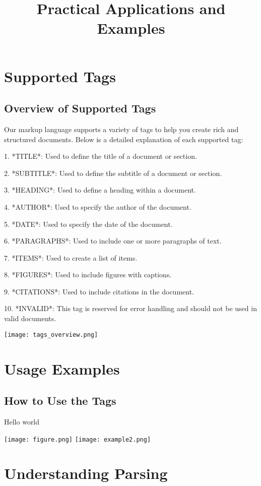 \documentclass[oneside]{memoir}
\begin{document}
\newpage
\chapter{Supported Tags}
\section{Overview of Supported Tags}
Our markup language supports a variety of tags to help you create rich and structured documents. Below is a detailed explanation of each supported tag:\par
1. *TITLE*: Used to define the title of a document or section.\par
2. *SUBTITLE*: Used to define the subtitle of a document or section.\par
3. *HEADING*: Used to define a heading within a document.\par
4. *AUTHOR*: Used to specify the author of the document.\par
5. *DATE*: Used to specify the date of the document.\par
6. *PARAGRAPHS*: Used to include one or more paragraphs of text.\par
7. *ITEMS*: Used to create a list of items.\par
8. *FIGURES*: Used to include figures with captions.\par
9. *CITATIONS*: Used to include citations in the document.\par
10. *INVALID*: This tag is reserved for error handling and should not be used in valid documents.\par
\texttt{[image: tags\_overview.png]}

\newpage
\chapter{Usage Examples}
\section{How to Use the Tags}
\title{Practical Applications and Examples}
Hello world\par
\texttt{[image: figure.png]}
\texttt{[image: example2.png]}

\newpage
\chapter{Understanding Parsing}
\end{document}

